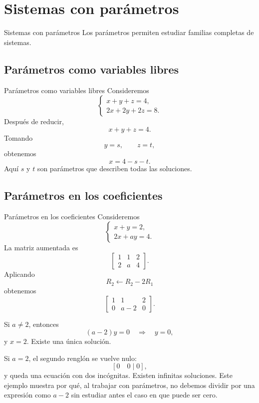 \documentclass[aspectratio=169,11pt]{beamer}
\theoremstyle{remark}
\begin{document}
\section{Sistemas con parámetros}
\begin{frame}[allowframebreaks]{Sistemas con parámetros}
\footnotesize
Los parámetros permiten estudiar familias completas de sistemas.

\end{frame}

\subsection*{Parámetros como variables libres}
\begin{frame}[allowframebreaks]{Parámetros como variables libres}
\footnotesize
Consideremos
\[
\begin{cases}
x+y+z=4,\\
2x+2y+2z=8.
\end{cases}
\]
Después de reducir,
\[
x+y+z=4.
\]
Tomando
\[
y=s,\qquad z=t,
\]
obtenemos
\[
x=4-s-t.
\]
Aquí $s$ y $t$ son parámetros que describen todas las soluciones.
\end{frame}

\subsection*{Parámetros en los coeficientes}
\begin{frame}[allowframebreaks]{Parámetros en los coeficientes}
\footnotesize
Consideremos
\[
\begin{cases}
x+y=2,\\
2x+ay=4.
\end{cases}
\]
La matriz aumentada es
\[
\left[
\begin{array}{cc|c}
1&1&2\\
2&a&4
\end{array}
\right].
\]
Aplicando
\[
R_2\leftarrow R_2-2R_1
\]
obtenemos
\[
\left[
\begin{array}{cc|c}
1&1&2\\
0&a-2&0
\end{array}
\right].
\]

Si $a\neq2$, entonces
\[
(a-2)y=0\quad\Longrightarrow\quad y=0,
\]
y $x=2$. Existe una única solución.

Si $a=2$, el segundo renglón se vuelve nulo:
\[
[0\quad0\mid0],
\]
y queda una ecuación con dos incógnitas. Existen infinitas soluciones. Este ejemplo muestra por qué, al trabajar con parámetros, no debemos dividir por una expresión como $a-2$ sin estudiar antes el caso en que puede ser cero.
\end{frame}
\end{document}
